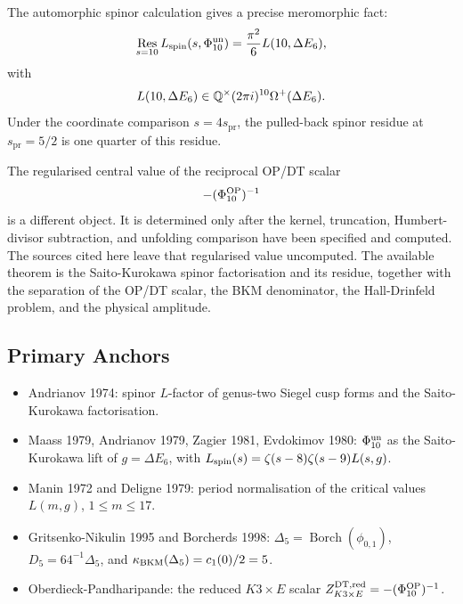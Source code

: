 The automorphic spinor calculation gives a precise meromorphic fact:
\[
        \operatorname*{Res}_{s=10}
        L_{\mathrm{spin}}(s,\Phi_{10}^{\mathrm{un}})
        =
        \frac{\pi^2}{6}L(10,\Delta E_6),
\]
with
\[
        L(10,\Delta E_6)\in
        \mathbb{Q}^{\times}(2\pi i)^{10}\Omega^+(\Delta E_6).
\]
Under the coordinate comparison \(s=4s_{\mathrm{pr}}\), the pulled-back
spinor residue at \(s_{\mathrm{pr}}=5/2\) is one quarter of this
residue.

The regularised central value of the reciprocal OP/DT scalar
\[
        -(\Phi_{10}^{\mathrm{OP}})^{-1}
\]
is a different object.  It is determined only after the kernel,
truncation, Humbert-divisor subtraction, and unfolding comparison have
been specified and computed.  The sources cited here leave that
regularised value uncomputed.  The available theorem is
the Saito-Kurokawa spinor factorisation and its residue, together with
the separation of the OP/DT scalar, the BKM denominator, the
Hall-Drinfeld problem, and the physical amplitude.

\subsection*{Primary Anchors}

\begin{itemize}
\item Andrianov 1974: spinor \(L\)-factor of genus-two Siegel cusp
forms and the Saito-Kurokawa factorisation.
\item Maass 1979, Andrianov 1979, Zagier 1981, Evdokimov 1980:
\(\Phi_{10}^{\mathrm{un}}\) as the Saito-Kurokawa lift of
\(g=\Delta E_6\), with
\(L_{\mathrm{spin}}(s)=\zeta(s-8)\zeta(s-9)L(s,g)\).
\item Manin 1972 and Deligne 1979: period normalisation of the
critical values \(L(m,g)\), \(1\leq m\leq17\).
\item Gritsenko-Nikulin 1995 and Borcherds 1998:
\(\Delta_5=\operatorname{Borch}(\phi_{0,1})\),
\(D_5=64^{-1}\Delta_5\), and
\(\kappa_{\mathrm{BKM}}(\Delta_5)=c_1(0)/2=5\).
\item Oberdieck-Pandharipande: the reduced \(K3\times E\) scalar
\(Z_{K3\times E}^{\mathrm{DT},\mathrm{red}}=-(\Phi_{10}^{\mathrm{OP}})^{-1}\).
\end{itemize}
